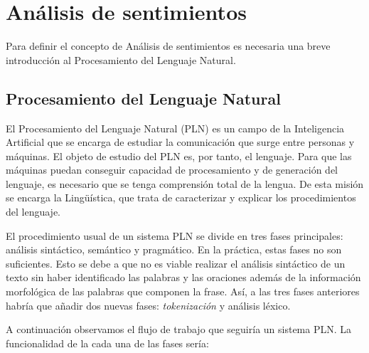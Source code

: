 

\chapter{Análisis de sentimientos}

	Para definir el concepto de Análisis de sentimientos es necesaria una breve introducción al Procesamiento del Lenguaje Natural.

\section{Procesamiento del Lenguaje Natural} \label{conceptsentiment}	
	
	 El Procesamiento del Lenguaje Natural (PLN) es un campo de la Inteligencia Artificial que se encarga de estudiar la comunicación que surge entre personas y máquinas. El objeto de estudio del PLN es, por tanto, el lenguaje. Para que las máquinas puedan conseguir capacidad de procesamiento y de generación del lenguaje, es necesario que se tenga comprensión total de la lengua. De esta misión se encarga la Lingüística, que trata de caracterizar y explicar los procedimientos del lenguaje.
	
	El procedimiento usual de un sistema PLN se divide en tres fases principales: análisis sintáctico, semántico y pragmático. En la práctica, estas fases no son suficientes. Esto se debe a que no es viable realizar el análisis sintáctico de un texto sin haber identificado las palabras y las oraciones además de la información morfológica de las palabras que componen la frase. Así, a las tres fases anteriores habría que añadir dos nuevas fases: \textit{tokenización} y análisis léxico.
	
	
	A continuación observamos el flujo de trabajo que seguiría un sistema PLN. La funcionalidad de la cada una de las fases sería:

